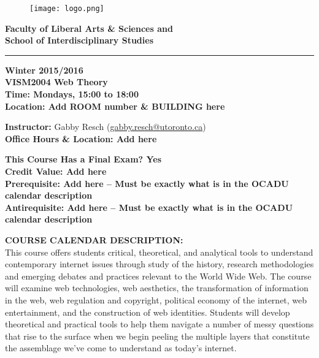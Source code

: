 \documentclass[10pt]{article}
\begin{document}
\begin{figure}
	\raggedleft
	\texttt{[image: logo.png]}
\end{figure}

\textbf{\LARGE{Faculty of Liberal Arts \& Sciences and \\
School of Interdisciplinary Studies}}\newline
\rule{\textwidth}{1pt}

\textbf{Winter 2015/2016}\\
\textbf{VISM2004 Web Theory}\\
\textbf{Time: Mondays, 15:00 to 18:00}\\
\textbf{Location: Add ROOM number \& BUILDING here}

\textbf{Instructor:} Gabby Resch (\href{mailto:gabby.resch@utoronto.ca}{gabby.resch@utoronto.ca})\\
\textbf{Office Hours \& Location: Add here}

\textbf{This Course Has a Final Exam? Yes}\\
\textbf{Credit Value: Add here}\\
\textbf{Prerequisite: Add here – Must be exactly what is in the OCADU calendar description}\\
\textbf{Antirequisite: Add here – Must be exactly what is in the OCADU calendar description}

\textbf{COURSE CALENDAR DESCRIPTION:}\\
This course offers students critical, theoretical, and analytical tools to understand contemporary internet issues through study of the history, research methodologies and emerging debates and practices relevant to the World Wide Web. The course will examine web technologies, web aesthetics, the transformation of information in the web, web regulation and copyright, political economy of the internet, web entertainment, and the construction of web identities. Students will develop theoretical and practical tools to help them navigate a number of messy questions that rise to the surface when we begin peeling the multiple layers that constitute the assemblage we've come to understand as today's internet.
\end{document}
